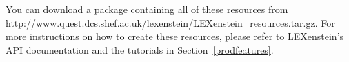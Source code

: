 You can download a package containing all of these resources from \url{http://www.quest.dcs.shef.ac.uk/lexenstein/LEXenstein_resources.tar.gz}. For more instructions on how to create these resources, please refer to LEXenstein's API documentation and the tutorials in Section~\ref{prodfeatures}.